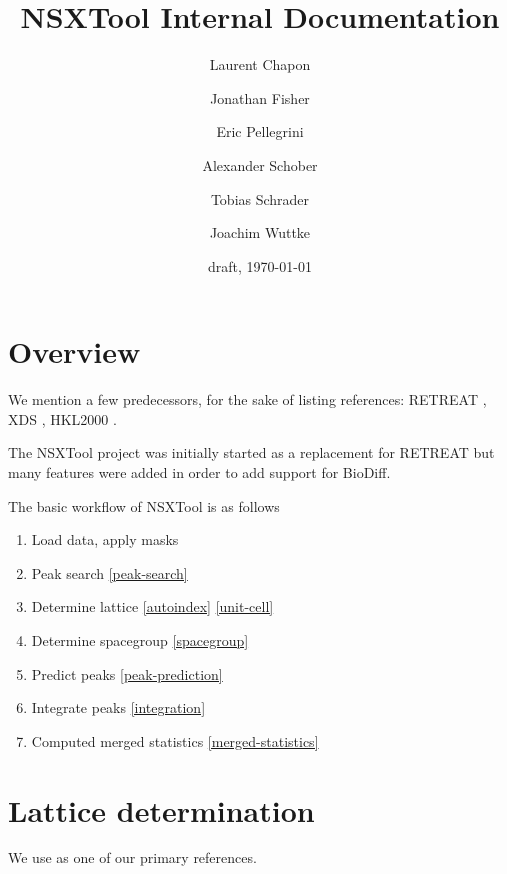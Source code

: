 \documentclass[twocolumn,preprintnumbers,amsmath,amssymb]{revtex4}
\begin{document}
\title{NSXTool Internal Documentation}
\author{Laurent Chapon}
\author{Jonathan Fisher}
\author{Eric Pellegrini}
\author{Alexander Schober}
\author{Tobias Schrader}
\author{Joachim Wuttke}

\date{draft, \today}


\maketitle

\section{Overview}
We mention a few predecessors, for the sake of listing references: RETREAT \cite{retreat-manual},
XDS \cite{xds-2010}, HKL2000 \cite{otwinowski-1997, denzo-scalepack, hkl2000-manual}.

The NSXTool project was initially started as a replacement for RETREAT but many features were added
in order to add support for BioDiff.

The basic workflow of NSXTool is as follows
\begin{enumerate}
  \item Load data, apply masks
  \item Peak search \ref{peak-search}
  \item Determine lattice \ref{autoindex} \ref{unit-cell}
  \item Determine spacegroup \ref{spacegroup}
  \item Predict peaks \ref{peak-prediction}
  \item Integrate peaks \ref{integration}
  \item Computed merged statistics \ref{merged-statistics}
\end{enumerate}

\section{Lattice determination}
We use \cite{crystal-lattices} as one of our primary references.
\end{document}
